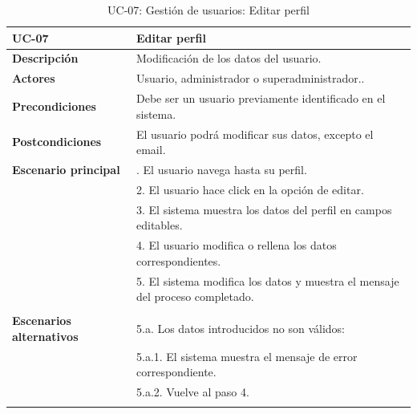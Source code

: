 \begin{table}[H]
  \begin{center}
    \begin{tabularx}{16.4cm}{|l|X|}
      \hline
      \textbf{UC-07} & \textbf{Editar perfil}\\
      \hline
      \textbf{Descripción} & Modificación de los datos del usuario.\\
      \hline
      \textbf{Actores} & Usuario, administrador o superadministrador..\\
      \hline
      \textbf{Precondiciones} & Debe ser un usuario previamente identificado en el sistema.\\
      \hline
      \textbf{Postcondiciones} & El usuario podrá modificar sus datos, excepto el email.\\
      \hline
      \textbf{Escenario principal} & \smallskip 1. El usuario navega hasta su perfil.\\
      & 2. El usuario hace click en la opción de editar. \\
      & 3. El sistema muestra los datos del perfil en campos editables.\\
      & 4. El usuario modifica o rellena los datos correspondientes.\\
      & 5. El sistema modifica los datos y muestra el mensaje del proceso completado.\\ 
      & \\
      \hline
      \textbf{Escenarios alternativos} & \smallskip 5.a. Los datos introducidos no son válidos:\\
      & \hspace{0.3cm} 5.a.1. El sistema muestra el mensaje de error correspondiente.\\
      & \hspace{0.3cm} 5.a.2. Vuelve al paso 4.\\
      & \\
      \hline
    \end{tabularx}
    \caption{UC-07: Gestión de usuarios: Editar perfil}
    \label{tab:CU-editar-perfil}
  \end{center}
\end{table}


